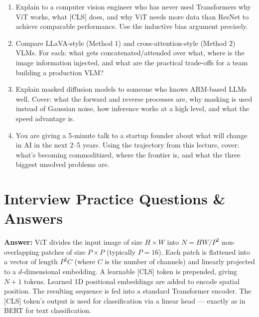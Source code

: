 \documentclass[11pt, a4paper]{article}
\begin{document}
\begin{enumerate}[leftmargin=2em]
  \item Explain to a computer vision engineer who has never used Transformers why ViT works, what [CLS] does, and why ViT needs more data than ResNet to achieve comparable performance. Use the inductive bias argument precisely.

  \item Compare LLaVA-style (Method 1) and cross-attention-style (Method 2) VLMs. For each: what gets concatenated/attended over what, where is the image information injected, and what are the practical trade-offs for a team building a production VLM?

  \item Explain masked diffusion models to someone who knows ARM-based LLMs well. Cover: what the forward and reverse processes are, why masking is used instead of Gaussian noise, how inference works at a high level, and what the speed advantage is.

  \item You are giving a 5-minute talk to a startup founder about what will change in AI in the next 2--5 years. Using the trajectory from this lecture, cover: what's becoming commoditized, where the frontier is, and what the three biggest unsolved problems are.
\end{enumerate}

\newpage
\section{Interview Practice Questions \& Answers}

\begin{notebox}
\textbf{Answer:} ViT divides the input image of size $H \times W$ into $N = HW/P^2$ non-overlapping patches of size $P \times P$ (typically $P=16$). Each patch is flattened into a vector of length $P^2 C$ (where $C$ is the number of channels) and linearly projected to a $d$-dimensional embedding. A learnable [CLS] token is prepended, giving $N+1$ tokens. Learned 1D positional embeddings are added to encode spatial position. The resulting sequence is fed into a standard Transformer encoder. The [CLS] token's output is used for classification via a linear head --- exactly as in BERT for text classification.
\end{notebox}
\end{document}
